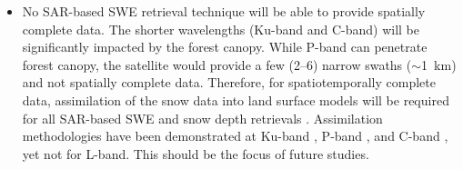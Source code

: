 \begin{enumerate}
\begin{itemize}
     \item No SAR-based SWE retrieval technique will be able to provide spatially complete data. The shorter wavelengths (Ku-band and C-band) will be significantly impacted by the forest canopy. While P-band can penetrate forest canopy, the satellite would provide a few (2--6) narrow swaths ($\sim$1~km) and not spatially complete data. Therefore, for spatiotemporally complete data, assimilation of the snow data into land surface models will be required for all SAR-based SWE and snow depth retrievals \citep{girottoDataAssimilationImproves2020}. Assimilation methodologies have been demonstrated at Ku-band \citep{wrzesienDevelopmentNatureRun2022, choEvaluatingUtilityActive2022}, P-band \citep{maEstimatingSpatiotemporallyContinuous2023}, and C-band \citep{girottoIdentifyingSnowfallElevation2023, brangersSentinel1SnowDepth2023}, yet not for L-band. This should be the focus of future studies.
    
   \end{itemize}
\end{enumerate}





